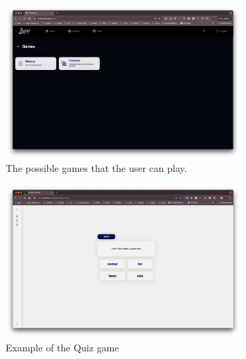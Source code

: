 \documentclass[12pt]{article}
\begin{document}
    \begin{figure}[h]
      \centering
      \caption{
      The possible games that the user can play.
      }
      \label{fig:site5}
      \includegraphics[width=0.8\textwidth]{assets/5.png}
    \end{figure}





    \begin{figure}[h]
      \centering
      \caption{
      Example of the Quiz game 
      }
      \label{fig:site8}
      \includegraphics[width=0.8\textwidth]{assets/8.png}
    \end{figure}
\end{document}
